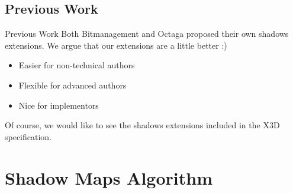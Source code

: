 \documentclass{beamer}
\begin{document}
\subsection{Previous Work}
\begin{frame}{Previous Work}
  Both Bitmanagement and Octaga proposed their own shadows extensions.
  We argue that our extensions are a little better :)

  \begin{itemize}
    \item Easier for non-technical authors%
    \item Flexible for advanced authors%
    \item Nice for implementors%
  \end{itemize}

  Of course, we would like to see the shadows extensions included
  in the X3D specification.
\end{frame}

\section{Shadow Maps Algorithm}
\end{document}
